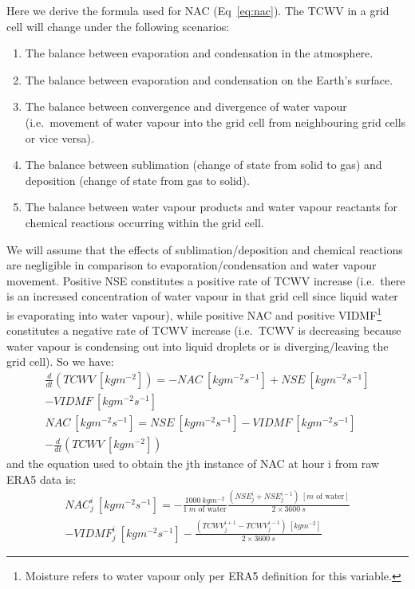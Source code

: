 Here we derive the formula used for \ac{NAC} (Eq~\ref{eq:nac}). The \ac{TCWV} in a grid cell will change under the following scenarios:
\begin{enumerate}
	\item The balance between evaporation and condensation in the atmosphere.
	\item The balance between evaporation and condensation on the Earth's surface.
	\item The balance between convergence and divergence of water vapour (i.e.\ movement of water vapour into the grid cell from neighbouring grid cells or vice versa).
	\item The balance between sublimation (change of state from solid to gas) and deposition (change of state from gas to solid).
	\item The balance between water vapour products and water vapour reactants for chemical reactions occurring within the grid cell.
\end{enumerate}
We will assume that the effects of sublimation/deposition and chemical reactions are negligible in comparison to evaporation/condensation and water vapour movement.
Positive \ac{NSE} constitutes a positive rate of \ac{TCWV} increase (i.e.\ there is an increased concentration of water vapour in that grid cell since liquid water is evaporating into water vapour), while positive \ac{NAC} and positive \ac{VIDMF}\footnote{Moisture refers to water vapour only per ERA5 definition for this variable.} constitutes a negative rate of \ac{TCWV} increase (i.e.\ \ac{TCWV} is decreasing because water vapour is condensing out into liquid droplets or is diverging/leaving the grid cell). So we have:
\begin{eqnarray}
	\frac{d}{dt}(TCWV \ [kg m^{-2}]) = -NAC \ [kg m^{-2} s^{-1}] + NSE \ [kg m^{-2} s^{-1}] \\
	- VIDMF \ [kg m^{-2} s^{-1}] \nonumber \\
	\label{eq:nac_app}
	NAC \ [kg m^{-2} s^{-1}] = NSE \ [kg m^{-2} s^{-1}] - VIDMF \ [kg m^{-2} s^{-1}] \\ 
	- \frac{d}{dt}(TCWV \ [kg m^{-2}]) \nonumber
\end{eqnarray}
and the equation used to obtain the jth instance of \ac{NAC} at hour i from raw \ac{ERA5} data is:
\begin{eqnarray}
	\label{eq:nac^i_j}
	NAC^i_j \ [kg m^{-2} s^{-1}] = - \frac{1000 \ kg m^{-2}}{1 \ m \mbox{ of water}} \frac{(NSE^i_j + NSE^{i-1}_j) \ [m \mbox{ of water}]}{2 \times 3600 \ s} \\
	- VIDMF^i_j \ [kg m^{-2} s^{-1}] - \frac{(TCWV^{i+1}_j - TCWV^{i-1}_j) \ [kg m^{-2}]}{2 \times 3600 \ s} \nonumber
\end{eqnarray}

